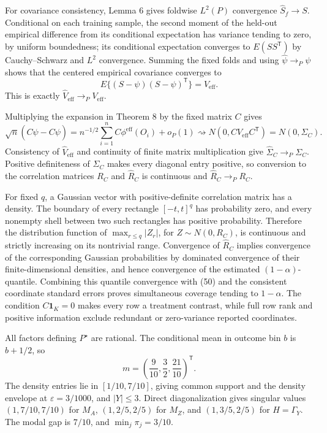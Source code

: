For covariance consistency, Lemma 6 gives foldwise \(L^2(P)\) convergence \(\widehat S_f\to S\).  Conditional on each training sample, the second moment of the held-out empirical difference from its conditional expectation has variance tending to zero, by uniform boundedness; its conditional expectation converges to \(E(SS^{\mathsf T})\) by Cauchy--Schwarz and \(L^2\) convergence.  Summing the fixed folds and using \(\widehat\psi\to_P\psi\) shows that the centered empirical covariance converges to
\[
E\{(S-\psi)(S-\psi)^{\mathsf T}\}=V_{\mathrm{eff}}.
\]
This is exactly \(\widehat V_{\mathrm{eff}}\to_PV_{\mathrm{eff}}\).

Multiplying the expansion in Theorem 8 by the fixed matrix \(C\) gives
\[
\sqrt n(C\widehat\psi-C\psi)
=n^{-1/2}\sum_{i=1}^nC\phi^{\mathrm{eff}}(O_i)+o_P(1)
\rightsquigarrow N(0,CV_{\mathrm{eff}}C^{\mathsf T})
=N(0,\Sigma_C). \tag{50}
\]
Consistency of \(\widehat V_{\mathrm{eff}}\) and continuity of finite matrix multiplication give \(\widehat\Sigma_C\to_P\Sigma_C\).  Positive definiteness of \(\Sigma_C\) makes every diagonal entry positive, so conversion to the correlation matrices \(R_C\) and \(\widehat R_C\) is continuous and \(\widehat R_C\to_PR_C\).

For fixed \(q\), a Gaussian vector with positive-definite correlation matrix has a density.  The boundary of every rectangle \([-t,t]^q\) has probability zero, and every nonempty shell between two such rectangles has positive probability.  Therefore the distribution function of \(\max_{r\leq q}|Z_r|\), for \(Z\sim N(0,R_C)\), is continuous and strictly increasing on its nontrivial range.  Convergence of \(\widehat R_C\) implies convergence of the corresponding Gaussian probabilities by dominated convergence of their finite-dimensional densities, and hence convergence of the estimated \((1-\alpha)\)-quantile.  Combining this quantile convergence with (50) and the consistent coordinate standard errors proves simultaneous coverage tending to \(1-\alpha\).  The condition \(C\mathbf 1_K=0\) makes every row a treatment contrast, while full row rank and positive information exclude redundant or zero-variance reported coordinates.

All factors defining \(P^\star\) are rational.  The conditional mean in outcome bin \(b\) is \(b+1/2\), so
\[
m=\left(\frac9{10},\frac32,\frac{21}{10}\right)^{\mathsf T}. \tag{51}
\]
The density entries lie in \([1/10,7/10]\), giving common support and the density envelope at \(\varepsilon=3/1000\), and \(|Y|\leq3\).  Direct diagonalization gives singular values \((1,7/10,7/10)\) for \(M_A\), \((1,2/5,2/5)\) for \(M_Z\), and \((1,3/5,2/5)\) for \(H=\Gamma_Y\).  The modal gap is \(7/10\), and \(\min_j\pi_j=3/10\).

